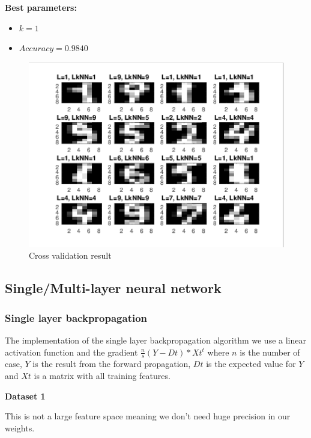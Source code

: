 \documentclass[a4paper,12pt]{article}
\begin{document}
\textbf{Best parameters:}
\begin{itemize}
\item $k = 1$
\item $Accuracy = 0.9840$
\end{itemize}

\begin{figure}[H]
\centering
\caption{Cross validation result}\label{fig:kNN-4-cv}
  \begin{minipage}[]{1\textwidth}
  \includegraphics[width=\textwidth]{figures/kNN_4_cv.png}
  \end{minipage}
\end{figure}

\subsection{Single/Multi-layer neural network}

\subsubsection{Single layer backpropagation}

The implementation of the single layer backpropagation algorithm we use a linear activation function and the gradient $\frac{n}{s}(Y-Dt)*Xt^t$ where $n$ is the number of case, $Y$ is the result from the forward propagation, $Dt$ is the expected value for $Y$ and $Xt$ is a matrix with all training features.


\noindent \textbf{Dataset 1}

This is not a large feature space meaning we don't need huge precision in our weights.
\end{document}
